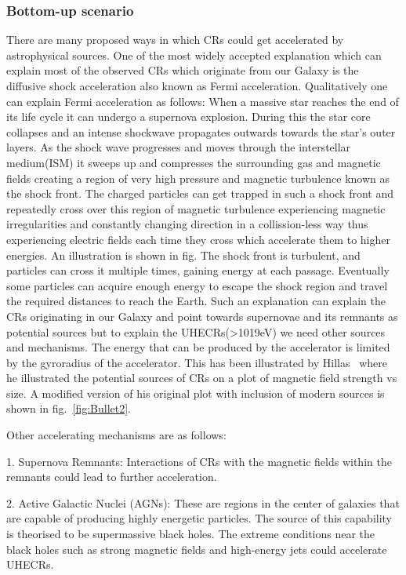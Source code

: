 \subsubsection{Bottom-up scenario}
\label{subsec:Bupsce}
There are many proposed ways in which CRs could get accelerated by astrophysical sources. One of the most widely accepted explanation which can explain most of the observed CRs which originate from our Galaxy is the diffusive shock acceleration also known as Fermi acceleration. Qualitatively one can explain Fermi acceleration as follows: When a massive star reaches the end of its life cycle it can undergo a supernova explosion. During this the star core collapses and an intense shockwave propagates outwards towards the star's outer layers. As the shock wave progresses and moves through the interstellar medium(ISM) it sweeps up and compresses the surrounding gas and magnetic fields creating a region of very high pressure and magnetic turbulence known as the shock front. The charged particles can get trapped in such a shock front and repeatedly cross over this region of magnetic turbulence experiencing magnetic irregularities and constantly changing direction in a collission-less way thus experiencing electric fields each time they cross which accelerate them to higher energies. An illustration is shown in fig. The shock front is turbulent, and particles can cross it multiple times, gaining energy at each passage. Eventually some particles can acquire enough energy to escape the shock region and travel the required distances to reach the Earth. Such an explanation can explain the CRs originating in our Galaxy and point towards supernovae and its remnants as potential sources but to explain the UHECRs(>1019eV) we need other sources and mechanisms. The energy that can be produced by the accelerator is limited by the gyroradius of the accelerator. This has been illustrated by Hillas~\cite{} where he illustrated the potential sources of CRs on a plot of magnetic field strength vs size. A modified version of his original plot with inclusion of modern sources is shown in fig.~\ref{fig:Bullet2}.   

Other accelerating mechanisms are as follows:


1. Supernova Remnants:  Interactions of CRs with the magnetic fields within the remnants could lead to further acceleration.

2. Active Galactic Nuclei (AGNs): These are regions in the center of galaxies that are capable of producing highly energetic particles. The source of this capability is theorised to be supermassive black holes. The extreme conditions near the black holes such as strong magnetic fields and high-energy jets could accelerate UHECRs.

